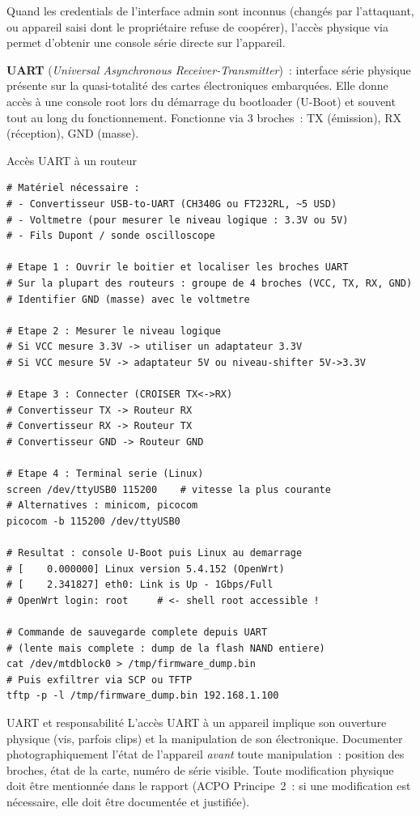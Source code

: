 Quand les credentials de l'interface admin sont inconnus (changés par
l'attaquant, ou appareil saisi dont le propriétaire refuse de coopérer),
l'accès physique via  permet d'obtenir une
console série directe sur l'appareil.

\begin{boxdef}
\textbf{UART} (\textit{Universal Asynchronous Receiver-Transmitter})~:
interface série physique présente sur la quasi-totalité des cartes
électroniques embarquées. Elle donne accès à une console root lors
du démarrage du bootloader (U-Boot) et souvent tout au long du
fonctionnement. Fonctionne via 3 broches~: TX (émission), RX
(réception), GND (masse).
\end{boxdef}

\begin{boxoutils}{Accès UART à un routeur}
\begin{lstlisting}[language=bash_forensique]
# Matériel nécessaire :
# - Convertisseur USB-to-UART (CH340G ou FT232RL, ~5 USD)
# - Voltmetre (pour mesurer le niveau logique : 3.3V ou 5V)
# - Fils Dupont / sonde oscilloscope

# Etape 1 : Ouvrir le boitier et localiser les broches UART
# Sur la plupart des routeurs : groupe de 4 broches (VCC, TX, RX, GND)
# Identifier GND (masse) avec le voltmetre

# Etape 2 : Mesurer le niveau logique
# Si VCC mesure 3.3V -> utiliser un adaptateur 3.3V
# Si VCC mesure 5V -> adaptateur 5V ou niveau-shifter 5V->3.3V

# Etape 3 : Connecter (CROISER TX<->RX)
# Convertisseur TX -> Routeur RX
# Convertisseur RX -> Routeur TX
# Convertisseur GND -> Routeur GND

# Etape 4 : Terminal serie (Linux)
screen /dev/ttyUSB0 115200    # vitesse la plus courante
# Alternatives : minicom, picocom
picocom -b 115200 /dev/ttyUSB0

# Resultat : console U-Boot puis Linux au demarrage
# [    0.000000] Linux version 5.4.152 (OpenWrt)
# [    2.341827] eth0: Link is Up - 1Gbps/Full
# OpenWrt login: root     # <- shell root accessible !

# Commande de sauvegarde complete depuis UART
# (lente mais complete : dump de la flash NAND entiere)
cat /dev/mtdblock0 > /tmp/firmware_dump.bin
# Puis exfiltrer via SCP ou TFTP
tftp -p -l /tmp/firmware_dump.bin 192.168.1.100
\end{lstlisting}
\end{boxoutils}

\begin{boiteRemarque}{UART et responsabilité}
L'accès UART à un appareil implique son ouverture physique (vis, parfois
clips) et la manipulation de son électronique. Documenter photographiquement
l'état de l'appareil \emph{avant} toute manipulation~: position des
broches, état de la carte, numéro de série visible. Toute modification
physique doit être mentionnée dans le rapport (ACPO Principe~2~: si une
modification est nécessaire, elle doit être documentée et justifiée).
\end{boiteRemarque}

